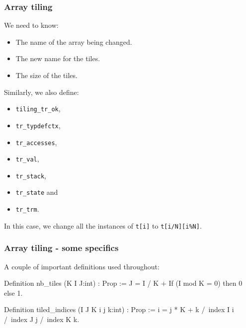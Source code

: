 \begin{frame}[fragile]
\frametitle{Array tiling}

We need to know:
\begin{itemize}
	\item The name of the array being changed.
	\item The new name for the tiles.
	\item The size of the tiles. 
\end{itemize}

\bigskip

Similarly, we also define:
\\[0.75em]
\begin{minipage}{0.45\linewidth}
\begin{itemize}
	\item \texttt{tiling\_tr\_ok},
	\item \texttt{tr\_typdefctx},
	\item \texttt{tr\_accesses},
	\item \texttt{tr\_val},
\end{itemize}
\end{minipage}%
\begin{minipage}{0.45\linewidth}
\begin{itemize}
	\item \texttt{tr\_stack},
	\item \texttt{tr\_state} and
	\item \texttt{tr\_trm}.
\end{itemize}
\end{minipage}

\bigskip

In this case, we change all the instances of \texttt{t[i]} to \texttt{t[i/N][i\%N]}.

\end{frame}


\begin{frame}[fragile]
\frametitle{Array tiling - some specifics}

A couple of important definitions used throughout:

\begin{coq}
Definition nb_tiles (K I J:int) : Prop :=
  J = I / K + If (I mod K = 0) then 0 else 1.

Definition tiled_indices (I J K i j k:int) : Prop :=
		i = j * K + k
	/\	index I i
	/\	index J j
  	/\	index K k.
\end{coq}

\end{frame}


